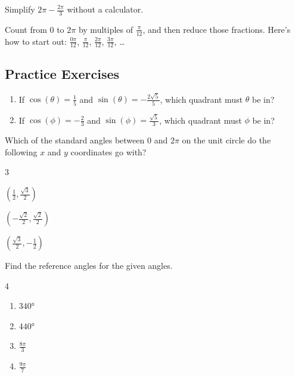 \begin{myPrep}
	Simplify $2\pi-\frac{2\pi}{3}$ without a calculator.
\end{myPrep}
\vfill

\begin{myPrep}
	Count from $0$ to $2\pi$ by multiples of $\frac{\pi}{12}$, and then reduce those fractions. Here's how to start out: $\frac{0\pi}{12}$, $\frac{\pi}{12}$, $\frac{2\pi}{12}$, $\frac{3\pi}{12}$, \ldots
\end{myPrep}
\vfill

\newpage

\subsection*{Practice Exercises} \label{practice-exercises-section-unit-circle}

\begin{myPractice}
	\begin{enumerate}
		\item If $\cos(\theta)=\frac{1}{5}$ and $\sin(\theta)=-\frac{2\sqrt{5}}{5}$, which quadrant must $\theta$ be in?
		\vfill
		\item If $\cos(\phi)=-\frac{2}{3}$ and $\sin(\phi)=\frac{\sqrt{5}}{3}$, which quadrant must $\phi$ be in?
		\vfill
	\end{enumerate}
\end{myPractice}

\begin{myPractice}
	Which of the standard angles between $0$ and $2\pi$ on the unit circle do the following $x$ and $y$ coordinates go with?
	\begin{enumerate}
	\end{enumerate}
\end{myPractice}
\vfill

\begin{myPractice}
	Find the reference angles for the given angles.
	\begin{multicols}{4}
		\begin{enumerate}
			\item $\ang{340}$
			\vfill
			\item $\ang{440}$
			\vfill
			\item $\frac{8\pi}{3}$
			\vfill
			\item $\frac{9\pi}{7}$
			\vfill
		\end{enumerate}
	\end{multicols}
\end{myPractice}
\vfill

